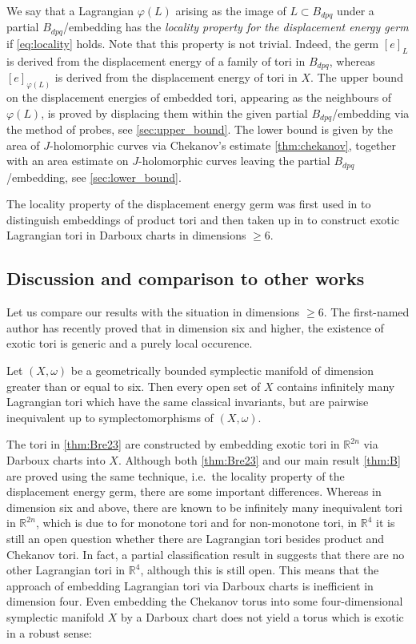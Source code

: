 \documentclass[12pt,a4paper,abstract=true,final]{scrartcl}
\begin{document}
We say that a Lagrangian $\varphi(L)$ arising as the image of $L \subset B_{dpq}$ under a partial $B_{dpq}$\-/embedding has the \emph{locality property for the displacement energy germ} if \eqref{eq:locality} holds. Note that this property is not trivial.
Indeed, the germ $[e]_L$ is derived from the displacement energy of a family of tori in $B_{dpq}$, whereas $[e]_{\varphi(L)}$ is derived from the displacement energy of tori in $X$. The upper bound on the displacement energies of embedded tori, appearing as the neighbours of $\varphi(L)$, is proved by displacing them within the given partial $B_{dpq}$\-/embedding via the method of probes, see \cref{sec:upper_bound}. The lower bound is given by the area of $J$-holomorphic curves via Chekanov's estimate \cref{thm:chekanov}, together with an area estimate on $J$-holomorphic curves leaving the partial $B_{dpq}$\-/embedding, see \cref{sec:lower_bound}.

The locality property of the displacement energy germ was first used in \cite{chekanovschlenk2015} to distinguish embeddings of product tori and then taken up in \cite{brendel2023local} to construct exotic Lagrangian tori in Darboux charts in dimensions $\geqslant 6$.

\subsection{Discussion and comparison to other works}
\label{sec:intro_discussion}

Let us compare our results with the situation in dimensions $\geqslant 6$.
The first-named author has recently proved that in dimension six and higher, the existence of exotic tori is generic and a purely local occurence. 
\begin{theorem}\cite[Theorem D]{brendel2023local}
    \label{thm:Bre23}
    Let $(X,\omega)$ be a geometrically bounded symplectic manifold of dimension greater than or equal to six.
    Then every open set of $X$ contains infinitely many Lagrangian tori which have the same classical invariants, but are pairwise inequivalent up to symplectomorphisms of $(X,\omega)$.
\end{theorem}

The tori in \cref{thm:Bre23} are constructed by embedding exotic tori in $\mathbb{R}^{2n}$ via Darboux charts into $X$.
Although both \cref{thm:Bre23} and our main result \cref{thm:B} are proved using the same technique, i.e.\ the locality property of the displacement energy germ, there are some important differences.
Whereas in dimension six and above, there are known to be infinitely many inequivalent tori in $\mathbb{R}^{2n}$, which is due to \cite{Aur15} for monotone tori and \cite{brendel2023local} for non-monotone tori, in $\mathbb{R}^4$ it is still an open question whether there are Lagrangian tori besides product and Chekanov tori.
In fact, a partial classification result in \cite{Riz19} suggests that there are no other Lagrangian tori in $\mathbb{R}^4$, although this is still open.
This means that the approach of embedding Lagrangian tori via Darboux charts is inefficient in dimension four.
Even embedding the Chekanov torus into some four-dimensional symplectic manifold $X$ by a Darboux chart does not yield a torus which is exotic in a robust sense:
 
\end{document}
